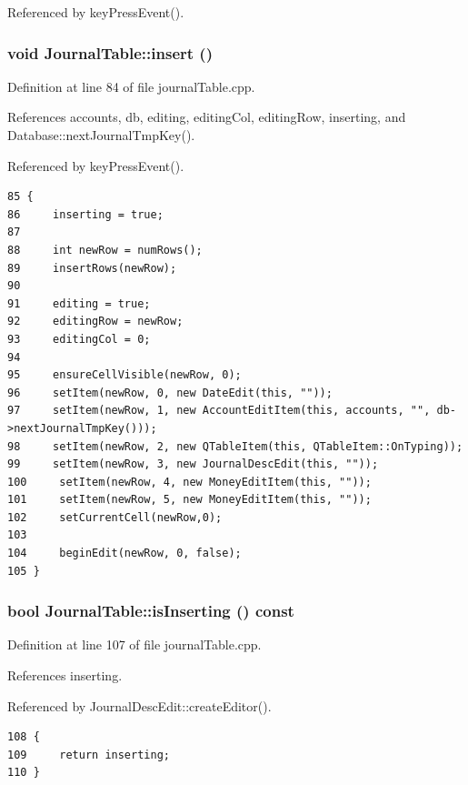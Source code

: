 Referenced by key\-Press\-Event().\hypertarget{classJournalTable_d0}{
\subsubsection[insert]{\setlength{\rightskip}{0pt plus 5cm}void Journal\-Table::insert ()}}
\label{classJournalTable_d0}


Definition at line 84 of file journal\-Table.cpp.

References accounts, db, editing, editing\-Col, editing\-Row, inserting, and Database::next\-Journal\-Tmp\-Key().

Referenced by key\-Press\-Event().

\footnotesize\begin{verbatim}85 {
86     inserting = true;
87 
88     int newRow = numRows();
89     insertRows(newRow);
90 
91     editing = true;
92     editingRow = newRow;
93     editingCol = 0;
94 
95     ensureCellVisible(newRow, 0);
96     setItem(newRow, 0, new DateEdit(this, ""));
97     setItem(newRow, 1, new AccountEditItem(this, accounts, "", db->nextJournalTmpKey()));
98     setItem(newRow, 2, new QTableItem(this, QTableItem::OnTyping));
99     setItem(newRow, 3, new JournalDescEdit(this, ""));
100     setItem(newRow, 4, new MoneyEditItem(this, ""));
101     setItem(newRow, 5, new MoneyEditItem(this, ""));
102     setCurrentCell(newRow,0);
103 
104     beginEdit(newRow, 0, false);
105 }
\end{verbatim}\normalsize 


\hypertarget{classJournalTable_a2}{
\subsubsection[isInserting]{\setlength{\rightskip}{0pt plus 5cm}bool Journal\-Table::is\-Inserting () const}}
\label{classJournalTable_a2}


Definition at line 107 of file journal\-Table.cpp.

References inserting.

Referenced by Journal\-Desc\-Edit::create\-Editor().

\footnotesize\begin{verbatim}108 {
109     return inserting;
110 }
\end{verbatim}\normalsize 


